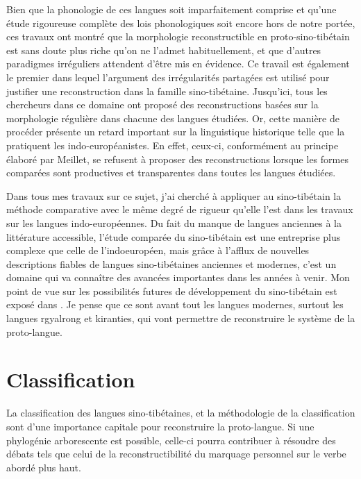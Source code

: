 \documentclass[oldfontcommands,oneside,a4paper,11pt]{memoir}
\begin{document}
Bien que la phonologie de ces langues soit imparfaitement comprise et qu’une étude rigoureuse complète des lois phonologiques soit encore hors de notre portée, ces travaux ont montré que la morphologie reconstructible en proto-sino-tibétain est sans doute plus riche qu’on ne l’admet habituellement, et que d’autres paradigmes irréguliers attendent d’être mis en évidence. Ce travail est également le premier dans lequel l’argument des irrégularités partagées est utilisé pour justifier une reconstruction dans la famille sino-tibétaine. Jusqu’ici, tous les chercheurs dans ce domaine ont proposé des reconstructions basées sur la morphologie régulière dans chacune des langues étudiées. Or, cette manière de procéder présente un retard important sur la linguistique historique telle que la pratiquent les indo-européanistes. En effet, ceux-ci, conformément au principe élaboré par Meillet, se refusent à proposer des reconstructions lorsque les formes comparées sont productives et transparentes dans toutes les langues étudiées. 


	Dans tous mes travaux sur ce sujet, j’ai cherché à appliquer au sino-tibétain la méthode comparative avec le même degré de rigueur qu’elle l’est dans les travaux sur les langues indo-européennes. Du fait du manque de langues anciennes à la littérature accessible, l’étude comparée du sino-tibétain est une entreprise plus complexe que celle de l’indoeuropéen, mais grâce à l’afflux de nouvelles descriptions fiables de langues sino-tibétaines anciennes et modernes, c’est un domaine qui va connaître des avancées importantes dans les années à venir. Mon point de vue sur les possibilités futures de développement du sino-tibétain est exposé dans \citet{jacques2015genetic}. Je pense que ce sont avant tout les langues modernes, surtout les langues rgyalrong et kiranties, qui vont permettre de reconstruire le système de la proto-langue. 

	\section{Classification}
	La classification des langues sino-tibétaines, et la méthodologie de la classification sont d'une importance capitale pour reconstruire la proto-langue. Si une phylogénie arborescente est possible, celle-ci pourra contribuer à résoudre des débats tels que celui de la reconstructibilité du marquage personnel sur le verbe abordé plus haut.
	
\end{document}
